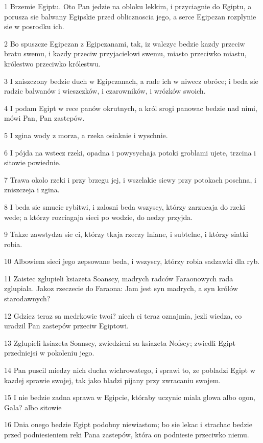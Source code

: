 \par 1 Brzemie Egiptu. Oto Pan jedzie na obloku lekkim, i przyciagnie do Egiptu, a porusza sie balwany Egipskie przed oblicznoscia jego, a serce Egipczan rozplynie sie w posrodku ich.
\par 2 Bo spuszcze Egipczan z Egipczanami, tak, iz walczyc bedzie kazdy przeciw bratu swemu, i kazdy przeciw przyjacielowi swemu, miasto przeciwko miastu, królestwo przeciwko królestwu.
\par 3 I zniszczony bedzie duch w Egipczanach, a rade ich w niwecz obróce; i beda sie radzic balwanów i wieszczków, i czarowników, i wrózków swoich.
\par 4 I podam Egipt w rece panów okrutnych, a król srogi panowac bedzie nad nimi, mówi Pan, Pan zastepów.
\par 5 I zgina wody z morza, a rzeka osiaknie i wyschnie.
\par 6 I pójda na wstecz rzeki, opadna i powysychaja potoki groblami ujete, trzcina i sitowie powiednie.
\par 7 Trawa okolo rzeki i przy brzegu jej, i wszelakie siewy przy potokach poschna, i zniszczeja i zgina.
\par 8 I beda sie smucic rybitwi, i zalosni beda wszyscy, którzy zarzucaja do rzeki wede; a którzy rozciagaja sieci po wodzie, do nedzy przyjda.
\par 9 Takze zawstydza sie ci, którzy tkaja rzeczy lniane, i subtelne, i którzy siatki robia.
\par 10 Albowiem sieci jego zepsowane beda, i wszyscy, którzy robia sadzawki dla ryb.
\par 11 Zaistec zglupieli ksiazeta Soanscy, madrych radców Faraonowych rada zglupiala. Jakoz rzeczecie do Faraona: Jam jest syn madrych, a syn królów starodawnych?
\par 12 Gdziez teraz sa medrkowie twoi? niech ci teraz oznajmia, jezli wiedza, co uradzil Pan zastepów przeciw Egiptowi.
\par 13 Zglupieli ksiazeta Soanscy, zwiedzieni sa ksiazeta Nofscy; zwiedli Egipt przedniejsi w pokoleniu jego.
\par 14 Pan puscil miedzy nich ducha wichrowatego, i sprawi to, ze pobladzi Egipt w kazdej sprawie swojej, tak jako bladzi pijany przy zwracaniu swojem.
\par 15 I nie bedzie zadna sprawa w Egipcie, któraby uczynic miala glowa albo ogon, Gala? albo sitowie
\par 16 Dnia onego bedzie Egipt podobny niewiastom; bo sie lekac i strachac bedzie przed podniesieniem reki Pana zastepów, która on podniesie przeciwko niemu.
